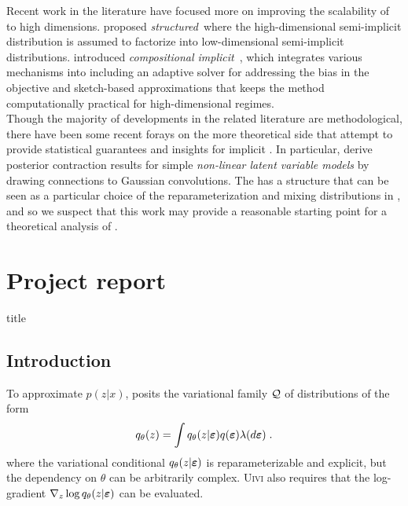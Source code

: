 \documentclass[10pt]{article}
\begin{document}
Recent work in the literature have focused more on improving the scalability of \sivi to high dimensions. \citet{Molchanova:2019} proposed \textit{structured}~\sivi where the high-dimensional semi-implicit distribution is assumed to factorize into low-dimensional semi-implicit distributions. \citet{Moens:2021} introduced \textit{compositional implicit}~\vi, which integrates various mechanisms into \sivi including an adaptive solver for addressing the bias in the \sivi objective and sketch-based approximations that keeps the method computationally practical for high-dimensional regimes.
\\

Though the majority of developments in the related literature are methodological, there have been some recent forays on the more theoretical side that attempt to provide statistical guarantees and insights for implicit \vi. In particular, \citet{Plummer:2021} derive posterior contraction results for simple \textit{non-linear latent variable models} by drawing connections to Gaussian convolutions. The \nllvm has a structure that can be seen as a particular choice of the reparameterization and mixing distributions in \uivi, and so we suspect that this work may provide a reasonable starting point for a theoretical analysis of \uivi.


\newpage


\section{Project report}

\todo title

\vspace{2em}
\begin{abstract}
\todo
\end{abstract}
\vspace{2em}

\subsection{Introduction}

\todo

To approximate $p(z|x)$, \uivi posits the variational family $\mathcal{Q}$ of distributions of the form
\[
q_\theta(z) = \int q_\theta(z|\bm{\varepsilon})q(\bm{\varepsilon})\lambda(d\bm{\varepsilon}) \;.
\]
where the variational conditional $q_\theta(z|\bm{\varepsilon})$ is reparameterizable and explicit, but the dependency on $\theta$ can be arbitrarily complex. \textsc{Uivi} also requires that the log-gradient $\nabla_z\log q_\theta(z|\bm{\varepsilon})$ can be evaluated.
\end{document}
